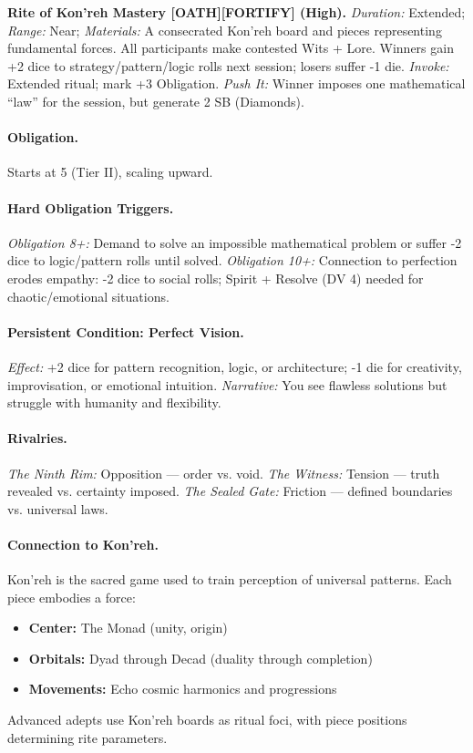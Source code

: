 \textbf{Rite of Kon'reh Mastery [OATH][FORTIFY] (High).}  
\emph{Duration:} Extended; \emph{Range:} Near; \emph{Materials:} A consecrated Kon'reh board and pieces representing fundamental forces.  
All participants make contested Wits + Lore. Winners gain +2 dice to strategy/pattern/logic rolls next session; losers suffer -1 die.  
\emph{Invoke:} Extended ritual; mark +3 Obligation.  
\emph{Push It:} Winner imposes one mathematical ``law'' for the session, but generate 2 SB (Diamonds).

\paragraph{Obligation.} Starts at 5 (Tier II), scaling upward.

\paragraph{Hard Obligation Triggers.}  
\emph{Obligation 8+:} Demand to solve an impossible mathematical problem or suffer -2 dice to logic/pattern rolls until solved.  
\emph{Obligation 10+:} Connection to perfection erodes empathy: -2 dice to social rolls; Spirit + Resolve (DV 4) needed for chaotic/emotional situations.

\paragraph{Persistent Condition: Perfect Vision.}  
\emph{Effect:} +2 dice for pattern recognition, logic, or architecture; -1 die for creativity, improvisation, or emotional intuition.  
\emph{Narrative:} You see flawless solutions but struggle with humanity and flexibility.

\paragraph{Rivalries.}  
\emph{The Ninth Rim:} Opposition --- order vs. void.  
\emph{The Witness:} Tension --- truth revealed vs. certainty imposed.  
\emph{The Sealed Gate:} Friction --- defined boundaries vs. universal laws.

\paragraph{Connection to Kon'reh.}  
Kon'reh is the sacred game used to train perception of universal patterns. Each piece embodies a force:  
\begin{itemize}
  \item \textbf{Center:} The Monad (unity, origin)  
  \item \textbf{Orbitals:} Dyad through Decad (duality through completion)  
  \item \textbf{Movements:} Echo cosmic harmonics and progressions  
\end{itemize}
Advanced adepts use Kon'reh boards as ritual foci, with piece positions determining rite parameters.

